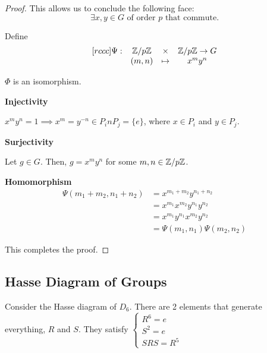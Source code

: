 \begin{proof}
    This allows us to conclude the following face: \[
        \exists x, y \in G \text{ of order } p \text{ that commute}.
    \]

    Define \[
        \begin{matrix}[rccc]
            \Psi: & \mathbb{Z}/p\mathbb{Z} & \times  & \mathbb{Z}/p\mathbb{Z} \to G \\
                  & (m, n) & \mapsto & x^m y^n
        \end{matrix}
    \]

    \begin{claim}
        $\Phi$ is an isomorphism.
    \end{claim}

    \begin{listu}
        \item \textbf{Injectivity}
        
        $x^m y^n = 1 \implies x^m = y^{-n} \in P_i n P_j = \{ e \}$, where $x \in P_i$ and $y \in P_j$.

        \item \textbf{Surjectivity}
        
        Let $g \in G$. Then, $g = x^m y^n$ for some $m, n \in \mathbb{Z}/p\mathbb{Z}$.

        \item \textbf{Homomorphism}
        \vspace{-1em}
        \begin{align*}
            \Psi(m_1 + m_2, n_1 + n_2) & = x^{m_1 + m_2} y^{n_1 + n_2}     \\
                                       & = x^{m_1} x^{m_2} y^{n_1} y^{n_2} \\
                                       & = x^{m_1} y^{n_1} x^{m_2} y^{n_2} \\
                                       & = \Psi(m_1, n_1) \Psi(m_2, n_2)
        \end{align*}
    \end{listu}

    This completes the proof.
\end{proof}

\subsection{Hasse Diagram of Groups}

Consider the Hasse diagram of $D_6$. There are 2 elements that generate everything, $R$ and $S$. They satisfy $\begin{cases}
    R^6 = e \\
    S^2 = e \\
    SRS = R^5 
\end{cases}$

